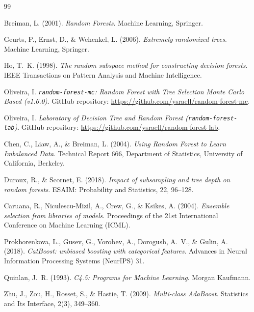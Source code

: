 \documentclass[11pt,a4paper]{article}
\newcommand{\code}[1]{\texttt{#1}}
\begin{document}
\begin{thebibliography}{99}

Breiman, L. (2001).
\newblock \emph{Random Forests}.
\newblock Machine Learning, Springer.

Geurts, P., Ernst, D., \& Wehenkel, L. (2006).
\newblock \emph{Extremely randomized trees}.
\newblock Machine Learning, Springer.

Ho, T.~K. (1998).
\newblock \emph{The random subspace method for constructing decision forests}.
\newblock IEEE Transactions on Pattern Analysis and Machine Intelligence.

Oliveira, I.
\newblock \emph{\textup{\code{random-forest-mc}}: Random Forest with Tree Selection Monte Carlo Based (v1.6.0)}.
\newblock GitHub repository: \url{https://github.com/ysraell/random-forest-mc}.

Oliveira, I.
\newblock \emph{Laboratory of Decision Tree and Random Forest (\textup{\code{random-forest-lab}})}.
\newblock GitHub repository: \url{https://github.com/ysraell/random-forest-lab}.

Chen, C., Liaw, A., \& Breiman, L. (2004).
\newblock \emph{Using Random Forest to Learn Imbalanced Data}.
\newblock Technical Report 666, Department of Statistics, University of California, Berkeley.

Duroux, R., \& Scornet, E. (2018).
\newblock \emph{Impact of subsampling and tree depth on random forests}.
\newblock ESAIM: Probability and Statistics, 22, 96--128.

Caruana, R., Niculescu-Mizil, A., Crew, G., \& Ksikes, A. (2004).
\newblock \emph{Ensemble selection from libraries of models}.
\newblock Proceedings of the 21st International Conference on Machine Learning (ICML).

Prokhorenkova, L., Gusev, G., Vorobev, A., Dorogush, A.~V., \& Gulin, A. (2018).
\newblock \emph{CatBoost: unbiased boosting with categorical features}.
\newblock Advances in Neural Information Processing Systems (NeurIPS) 31.

Quinlan, J.~R. (1993).
\newblock \emph{C4.5: Programs for Machine Learning}.
\newblock Morgan Kaufmann.

Zhu, J., Zou, H., Rosset, S., \& Hastie, T. (2009).
\newblock \emph{Multi-class AdaBoost}.
\newblock Statistics and Its Interface, 2(3), 349--360.

\end{thebibliography}
\end{document}
